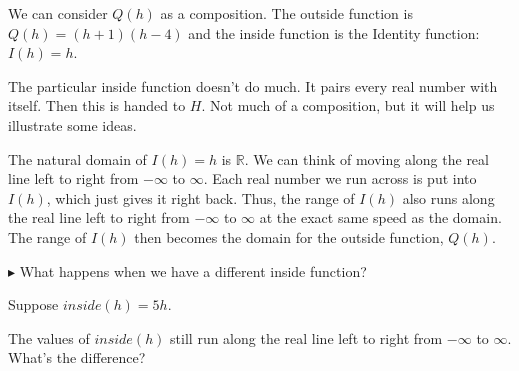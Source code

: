 \documentclass{ximera}
\begin{document}
\begin{image}
\end{image}


We can consider $Q(h)$ as a composition.  The outside function is $Q(h) = (h+1)(h-4)$ and the inside function is the Identity function: $I(h)=h$.  

The particular inside function doesn't do much.  It pairs every real number with itself.  Then this is handed to $H$. Not much of a composition, but it will help us illustrate some ideas.



The natural domain of $I(h)=h$ is \textbf{$\mathbb{R}$}.  We can think of moving along the real line left to right from $-\infty$ to $\infty$.  Each real number we run across is put into $I(h)$, which just gives it right back.  Thus, the range of $I(h)$ also runs along the real line left to right from $-\infty$ to $\infty$ at the exact same speed as the domain.  The range of $I(h)$ then becomes the domain for the outside function, $Q(h)$. 



$\blacktriangleright$  What happens when we have a different inside function? 


Suppose $inside(h) = 5h$.


The values of $inside(h)$ still run along the real line left to right from $-\infty$ to $\infty$. What's the difference?
\end{document}
